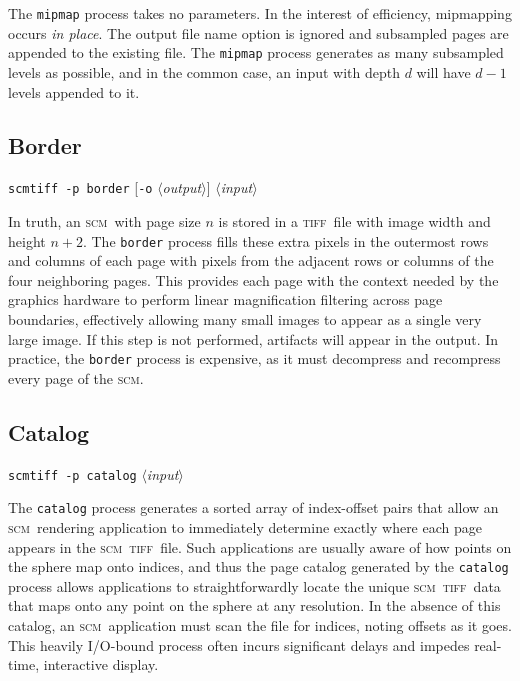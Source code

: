 \documentclass[oneside,10pt]{memoir}
\newcommand{\scm}     {\textsc{scm}}
\newcommand{\tiff}    {\textsc{tiff}}
\newcommand{\scmtiff} {\texttt{scmtiff}}
\newcommand{\inangles}[1]{$\langle$#1$\rangle$}
\begin{document}
\begin{Spacing}{1.1}
The \texttt{mipmap} process takes no parameters. In the interest of efficiency, mipmapping occurs \textit{in place}. The output file name option is ignored and subsampled pages are appended to the existing file. The \texttt{mipmap} process generates as many subsampled levels as possible, and in the common case, an input with depth $d$ will have $d-1$ levels appended to it.

\subsection{Border}

\noindent\scmtiff\ \texttt{-p border} [\texttt{-o} \inangles{\textit{output}}] \inangles{\textit{input}}

\bigskip In truth, an \scm\ with page size $n$ is stored in a \tiff\ file with image width and height $n+2$. The \texttt{border} process fills these extra pixels in the outermost rows and columns of each page with pixels from the adjacent rows or columns of the four neighboring pages. This provides each page with the context needed by the graphics hardware to perform linear magnification filtering across page boundaries, effectively allowing many small images to appear as a single very large image. If this step is not performed, artifacts will appear in the output. In practice, the \texttt{border} process is expensive, as it must decompress and recompress every page of the \scm.

\subsection{Catalog}

\noindent\scmtiff\ \texttt{-p catalog} \inangles{\textit{input}}

\bigskip The \texttt{catalog} process generates a sorted array of index-offset pairs that allow an \scm\ rendering application to immediately determine exactly where each page appears in the \scm\ \tiff\ file. Such applications are usually aware of how points on the sphere map onto indices, and thus the page catalog generated by the \texttt{catalog} process allows applications to straightforwardly locate the unique \scm\ \tiff\ data that maps onto any point on the sphere at any resolution. In the absence of this catalog, an \scm\ application must scan the file for indices, noting offsets as it goes. This heavily I/O-bound process often incurs significant delays and impedes real-time, interactive display.


\end{Spacing}
\end{document}
